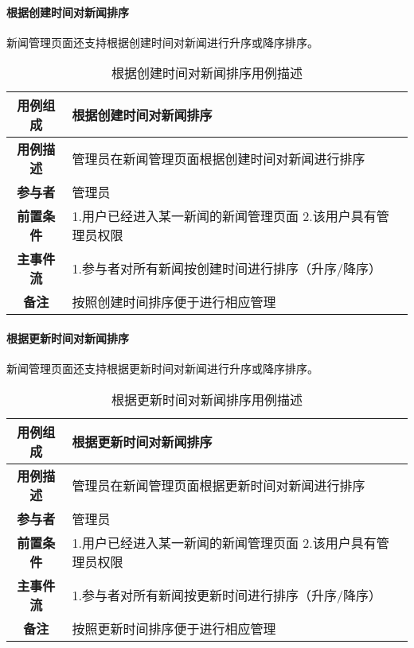 \paragraph{根据创建时间对新闻排序}

新闻管理页面还支持根据创建时间对新闻进行升序或降序排序。\\

\begin{table}[H]
	\centering
	\caption{根据创建时间对新闻排序用例描述}
	\renewcommand\arraystretch{1.5}
	\begin{tabular}{|c|>{\raggedright\arraybackslash}p{10cm}|}
		\hline
		\textbf{用例组成} & \textbf{根据创建时间对新闻排序}\\
		\hline
		\textbf{用例描述} & 管理员在新闻管理页面根据创建时间对新闻进行排序\\ 
		\hline
		\textbf{参与者} & 管理员\\
		\hline
		\textbf{前置条件} & 
		1.用户已经进入某一新闻的新闻管理页面\newline
		2.该用户具有管理员权限\\
		\hline
		\textbf{主事件流} & 
		1.参与者对所有新闻按创建时间进行排序（升序/降序）\\
		\hline
		\textbf{备注} & 按照创建时间排序便于进行相应管理\\
		\hline
	\end{tabular}
\end{table}

\paragraph{根据更新时间对新闻排序}

新闻管理页面还支持根据更新时间对新闻进行升序或降序排序。\\

\begin{table}[H]
	\centering
	\caption{根据更新时间对新闻排序用例描述}
	\renewcommand\arraystretch{1.5}
	\begin{tabular}{|c|>{\raggedright\arraybackslash}p{10cm}|}
		\hline
		\textbf{用例组成} & \textbf{根据更新时间对新闻排序}\\
		\hline
		\textbf{用例描述} & 管理员在新闻管理页面根据更新时间对新闻进行排序\\ 
		\hline
		\textbf{参与者} & 管理员\\
		\hline
		\textbf{前置条件} & 
		1.用户已经进入某一新闻的新闻管理页面\newline
		2.该用户具有管理员权限\\
		\hline
		\textbf{主事件流} & 
		1.参与者对所有新闻按更新时间进行排序（升序/降序）\\
		\hline
		\textbf{备注} & 按照更新时间排序便于进行相应管理\\
		\hline
	\end{tabular}
\end{table}

